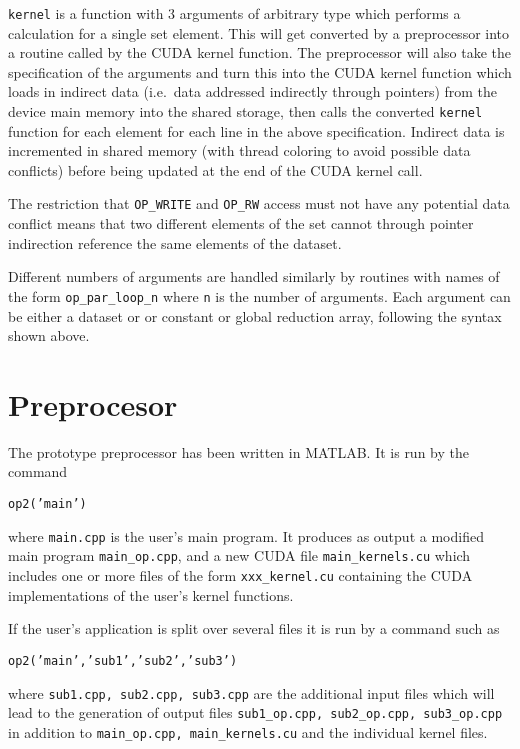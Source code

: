 {\tt kernel} is a function with 3 arguments of arbitrary type which performs
a calculation for a single set element.
This will get converted by a preprocessor into a routine called by the CUDA kernel 
function.  The preprocessor will also take the specification of the arguments and turn 
this into the CUDA kernel function which loads in indirect data (i.e.~data addressed 
indirectly through pointers) from the device main memory into the shared storage, 
then calls the converted {\tt kernel} function for each element for each line in 
the above specification.  Indirect data is incremented in shared memory (with
thread coloring to avoid possible data conflicts) before being updated at the end 
of the CUDA kernel call.

The restriction that {\tt OP\_WRITE} and {\tt OP\_RW} access must not have any 
potential data conflict means that two different elements of the set cannot 
through pointer indirection reference the same elements of the dataset.  


Different numbers of arguments are handled similarly by routines with names
of the form {\tt op\_par\_loop\_n} where {\tt n} is the number of arguments.
Each argument can be either a dataset or or constant or global reduction array,
following the syntax shown above.


\section{Preprocesor}

The prototype preprocessor has been written in MATLAB.  It is run by the command

{\tt op2('main')}

\noindent
where {\tt main.cpp} is the user's main program.  It produces as output a 
modified main program {\tt main\_op.cpp}, and a new CUDA file {\tt main\_kernels.cu}
which includes one or more files of the form {\tt xxx\_kernel.cu} containing 
the CUDA implementations of the user's kernel functions.

If the user's application is split over several files it is run by a command such as

{\tt op2('main','sub1','sub2','sub3')}

\noindent
where {\tt sub1.cpp, sub2.cpp, sub3.cpp} are the additional input files which will 
lead to the generation of output files {\tt sub1\_op.cpp, sub2\_op.cpp, sub3\_op.cpp} 
in addition to {\tt main\_op.cpp, main\_kernels.cu} and the individual kernel files.


